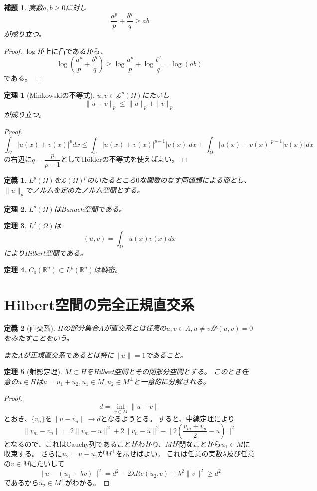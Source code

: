 \documentclass{jsarticle}
\newtheorem{dfn}{定義}
\newtheorem{thm}{定理}
\newtheorem{lem}{補題}
\newcommand{\R}{\mathbb{R}}
\newcommand{\abs}[1]{|#1|}
\newcommand{\norm}[1]{\|#1\|}
\begin{document}
\begin{lem}
実数$a, b\geq0$に対し
\[
\frac{a^p}{p}+\frac{b^q}{q}\geq ab
\]
が成り立つ。
\end{lem}
\begin{proof}
$\log$が上に凸であるから、
\[
\log\left(\frac{a^p}{p}+\frac{b^q}{q}\right)\geq\log\frac{a^p}{p}+\log\frac{b^q}{q}=\log(ab)
\]
である。
\end{proof}
 
\begin{thm}[Minkowskiの不等式]
$u,v\in \mathcal{L}^p(\Omega)$にたいし
\[
\norm{u+v}_p\leq\norm{u}_p+\norm{v}_p
\]
が成り立つ。
\end{thm}
\begin{proof}
\[
\int_\Omega\abs{u(x)+v(x)}^pdx\leq\int_\omega\abs{u(x)+v(x)}^{p-1}\abs{v(x)}dx+\int_\Omega\abs{u(x)+v(x)}^{p-1}\abs{v(x)}dx
\]
の右辺に$q=\dfrac{p}{p-1}$としてH\"olderの不等式を使えばよい。
\end{proof}

\begin{dfn}
$L^p(\Omega)$を$\mathcal{L}(\Omega)^p$のいたるところ$0$な関数のなす同値類による商とし、
$\norm{u}_p$でノルムを定めたノルム空間とする。
\end{dfn}

\begin{thm}
$L^p(\Omega)$はBanach空間である。
\end{thm}

\begin{thm}
$L^2(\Omega)$は
\[
(u,v)=\int_\Omega u(x)\overline{v(x)}dx
\]
によりHilbert空間である。
\end{thm}

\begin{thm}
$C_0(\R^n)\subset L^p(\R^n)$は稠密。
\end{thm}
\section{Hilbert空間の完全正規直交系}
\begin{dfn}[直交系]
$H$の部分集合$A$が直交系とは任意の$u,v\in A, u\neq v$が$(u,v)=0$をみたすことをいう。

また$A$が正規直交系であるとは特に$\norm{u}=1$であること。
\end{dfn}

\begin{thm}[射影定理]
$M\subset H$をHilbert空間とその閉部分空間とする。
このとき任意の$u\in H$は$u=u_1+u_2, u_1\in M, u_2\in M^\perp$と一意的に分解される。
\end{thm}
\begin{proof}
\[
d=\inf_{v\in M}\norm{u-v}
\]
とおき、$\{v_n\}$を$\norm{u-v_n}\to d$となるようとる。
すると、中線定理により
\[
\norm{v_m-v_n}=2\norm{v_m-u}^2+2\norm{v_n-u}^2-\norm{2(\frac{v_m+v_n}{2}-u)}^2
\]
となるので、これはCauchy列であることがわかり、$M$が閉なことから$u_1\in M$に収束する。
さらに$u_2=u-u_1$が$M^\perp$を示せばよい。
これは任意の実数$\lambda$及び任意の$v\in M$にたいして
\[
\norm{u-(u_1+\lambda v)}^2=d^2-2\lambda Re(u_2,v)+\lambda^2\norm{v}^2\geq d^2
\]
であるから$u_2\in M^\perp$がわかる。
\end{proof}
\end{document}
